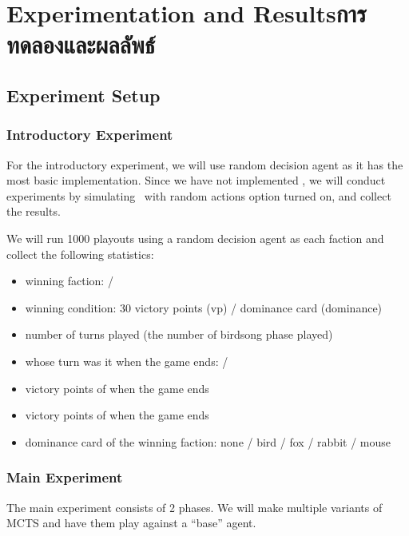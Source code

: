 \chapter{
    \ifenglish Experimentation and Results\else การทดลองและผลลัพธ์\fi
}



\section{Experiment Setup}

\subsection{Introductory Experiment}
For the introductory experiment, we will use random decision agent as it has the most basic implementation. Since we have not implemented \RootAI, we will conduct experiments by simulating \RootOurs \ with random actions option turned on, and collect the results. 

We will run 1000 \glspl{playout} using a random decision agent as each faction and collect the following statistics:
\begin{itemize}
    \item winning faction: \Marquise{} / \Eyrie
    \item winning condition: 30 victory points (vp) / dominance card (dominance)
    \item number of turns played (the number of birdsong phase played)
    \item whose turn was it when the game ends: \Marquise{} / \Eyrie
    \item victory points of \Marquise{} when the game ends
    \item victory points of \Eyrie{} when the game ends
    \item dominance card of the winning faction: none / bird / fox / rabbit / mouse
\end{itemize}

\subsection{Main Experiment}
The main experiment consists of 2 phases. We will make multiple variants of MCTS and have them play against a ``base'' agent. 

